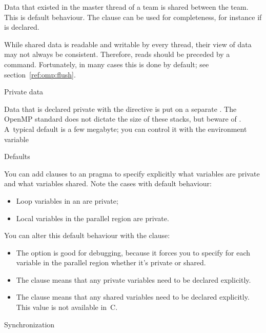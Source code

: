 Data that existed in the master thread of a team
is shared between the team. This is default behaviour.
The clause  can be used for completeness,
for instance if  is declared.

While shared data is readable and writable by every thread, their view
of data may not always be consistent. Therefore, reads should be
preceded by a  command.  Fortunately, in many cases
this is done by default; see section~\ref{ref:omp:flush}.

 {Private data}

Data that is declared private with the  directive is
put on a separate . The OpenMP standard
does not dictate the size of these stacks, but beware of .
A~typical default
is a few megabyte; you can control it with the environment variable


 {Defaults}

You can add clauses to an  pragma
to specify explicitly what variables are private and what variables shared.
Note the cases with default behaviour:
\begin{itemize}
\item Loop variables in an  are private;
\item Local variables in the parallel region are private.
\end{itemize}
You can alter this default behaviour with the  clause:
\begin{itemize}
\item The  option is good for debugging, 
  because it forces you to specify for each variable in the parallel region
  whether it's private or shared.
\item The  clause means that any private variables
  need to be declared explicitly.
\item The  clause means that any shared variables
  need to be declared explicitly. This value is not available in~C.
\end{itemize}

 {Synchronization}

